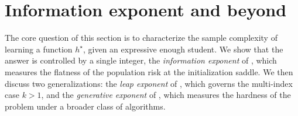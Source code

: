\section{Information exponent and beyond}
\label{sec:intro:exponents}
The core question of this section is to characterize the sample complexity of learning a function \(h^\star\), given an expressive enough student. We show that the answer is controlled by a single integer, the \emph{information exponent} of \citet{arous2021online}, which measures the flatness of the population risk at the initialization saddle. We then discuss two generalizations: the \emph{leap exponent} of \citet{abbe2022merged, abbe2023sgd}, which governs the multi-index case \(k > 1\), and the \emph{generative exponent} of \citet{damian2024computational}, which measures the hardness of the problem under a broader class of algorithms. 



